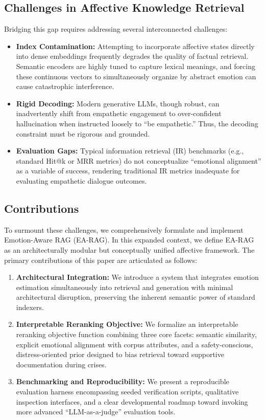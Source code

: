 \documentclass[conference]{IEEEtran}
\begin{document}
\subsection{Challenges in Affective Knowledge Retrieval}
Bridging this gap requires addressing several interconnected challenges:
\begin{itemize}
    \item \textbf{Index Contamination:} Attempting to incorporate affective states directly into dense embeddings frequently degrades the quality of factual retrieval. Semantic encoders are highly tuned to capture lexical meanings, and forcing these continuous vectors to simultaneously organize by abstract emotion can cause catastrophic interference.
    \item \textbf{Rigid Decoding:} Modern generative LLMs, though robust, can inadvertently shift from empathetic engagement to over-confident hallucination when instructed loosely to ``be empathetic.'' Thus, the decoding constraint must be rigorous and grounded.
    \item \textbf{Evaluation Gaps:} Typical information retrieval (IR) benchmarks (e.g., standard Hit@k or MRR metrics) do not conceptualize ``emotional alignment'' as a variable of success, rendering traditional IR metrics inadequate for evaluating empathetic dialogue outcomes.
\end{itemize}

\subsection{Contributions}
To surmount these challenges, we comprehensively formulate and implement Emotion-Aware RAG (EA-RAG). In this expanded context, we define EA-RAG as an architecturally modular but conceptually unified affective framework. The primary contributions of this paper are articulated as follows:
\begin{enumerate}
    \item \textbf{Architectural Integration:} We introduce a system that integrates emotion estimation simultaneously into retrieval and generation with minimal architectural disruption, preserving the inherent semantic power of standard indexers.
    \item \textbf{Interpretable Reranking Objective:} We formalize an interpretable reranking objective function combining three core facets: semantic similarity, explicit emotional alignment with corpus attributes, and a safety-conscious, distress-oriented prior designed to bias retrieval toward supportive documentation during crises.
    \item \textbf{Benchmarking and Reproducibility:} We present a reproducible evaluation harness encompassing seeded verification scripts, qualitative inspection interfaces, and a clear developmental roadmap toward invoking more advanced ``LLM-as-a-judge'' evaluation tools. 
\end{enumerate}
\end{document}
